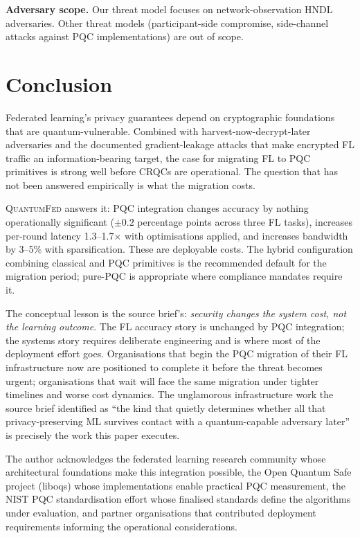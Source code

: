\documentclass[sigconf,nonacm]{acmart}
\begin{document}
\textbf{Adversary scope.} Our threat model focuses on
network-observation HNDL adversaries. Other threat models
(participant-side compromise, side-channel attacks against PQC
implementations) are out of scope.

\section{Conclusion}

Federated learning's privacy guarantees depend on cryptographic
foundations that are quantum-vulnerable. Combined with
harvest-now-decrypt-later adversaries and the documented
gradient-leakage attacks that make encrypted FL traffic an
information-bearing target, the case for migrating FL to PQC
primitives is strong well before CRQCs are operational. The
question that has not been answered empirically is what the
migration costs.

\textsc{QuantumFed} answers it: PQC integration changes accuracy by
nothing operationally significant ($\pm 0.2$ percentage points
across three FL tasks), increases per-round latency
1.3--1.7$\times$ with optimisations applied, and increases bandwidth
by 3--5\% with sparsification. These are deployable costs. The
hybrid configuration combining classical and PQC primitives is the
recommended default for the migration period; pure-PQC is
appropriate where compliance mandates require it.

The conceptual lesson is the source brief's: \emph{security changes
the system cost, not the learning outcome}. The FL accuracy story
is unchanged by PQC integration; the systems story requires
deliberate engineering and is where most of the deployment effort
goes. Organisations that begin the PQC migration of their FL
infrastructure now are positioned to complete it before the threat
becomes urgent; organisations that wait will face the same migration
under tighter timelines and worse cost dynamics. The unglamorous
infrastructure work the source brief identified as ``the kind that
quietly determines whether all that privacy-preserving ML survives
contact with a quantum-capable adversary later'' is precisely the
work this paper executes.

\begin{acks}
The author acknowledges the federated learning research community
whose architectural foundations make this integration possible, the
Open Quantum Safe project (liboqs) whose implementations enable
practical PQC measurement, the NIST PQC standardisation effort whose
finalised standards define the algorithms under evaluation, and
partner organisations that contributed deployment requirements
informing the operational considerations.
\end{acks}
\end{document}
